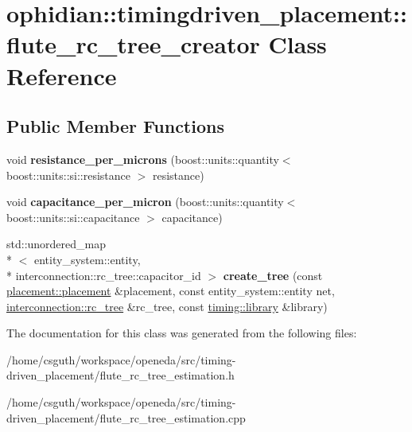 \hypertarget{classophidian_1_1timingdriven__placement_1_1flute__rc__tree__creator}{\section{ophidian\-:\-:timingdriven\-\_\-placement\-:\-:flute\-\_\-rc\-\_\-tree\-\_\-creator Class Reference}
\label{classophidian_1_1timingdriven__placement_1_1flute__rc__tree__creator}
}
\subsection*{Public Member Functions}
\begin{DoxyCompactItemize}
\item 
\hypertarget{classophidian_1_1timingdriven__placement_1_1flute__rc__tree__creator_a83535cfa2b8c12154515584aeb6bff6e}{void {\bfseries resistance\-\_\-per\-\_\-microns} (boost\-::units\-::quantity$<$ boost\-::units\-::si\-::resistance $>$ resistance)}\label{classophidian_1_1timingdriven__placement_1_1flute__rc__tree__creator_a83535cfa2b8c12154515584aeb6bff6e}

\item 
\hypertarget{classophidian_1_1timingdriven__placement_1_1flute__rc__tree__creator_a8f7b73a96e1f6e98bf4b5f045c541b9c}{void {\bfseries capacitance\-\_\-per\-\_\-micron} (boost\-::units\-::quantity$<$ boost\-::units\-::si\-::capacitance $>$ capacitance)}\label{classophidian_1_1timingdriven__placement_1_1flute__rc__tree__creator_a8f7b73a96e1f6e98bf4b5f045c541b9c}

\item 
\hypertarget{classophidian_1_1timingdriven__placement_1_1flute__rc__tree__creator_a6930a5823bf8d4b8e18ffad5093e26aa}{std\-::unordered\-\_\-map\\*
$<$ entity\-\_\-system\-::entity, \\*
interconnection\-::rc\-\_\-tree\-::capacitor\-\_\-id $>$ {\bfseries create\-\_\-tree} (const \hyperlink{classophidian_1_1placement_1_1placement}{placement\-::placement} \&placement, const entity\-\_\-system\-::entity net, \hyperlink{classophidian_1_1interconnection_1_1rc__tree}{interconnection\-::rc\-\_\-tree} \&rc\-\_\-tree, const \hyperlink{classophidian_1_1timing_1_1library}{timing\-::library} \&library)}\label{classophidian_1_1timingdriven__placement_1_1flute__rc__tree__creator_a6930a5823bf8d4b8e18ffad5093e26aa}

\end{DoxyCompactItemize}


The documentation for this class was generated from the following files\-:\begin{DoxyCompactItemize}
\item 
/home/csguth/workspace/openeda/src/timing-\/driven\-\_\-placement/flute\-\_\-rc\-\_\-tree\-\_\-estimation.\-h\item 
/home/csguth/workspace/openeda/src/timing-\/driven\-\_\-placement/flute\-\_\-rc\-\_\-tree\-\_\-estimation.\-cpp\end{DoxyCompactItemize}
